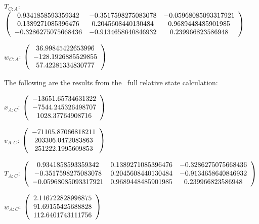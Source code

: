 \begin{description}
$T_{C:A}$: $\left( \begin{array} {ccc}
 0.9341858593359342 &   -0.3517598275083078 &  -0.05968085093317921 \\
  0.1389271085396476 &    0.2045608440130484 &    0.9689448485901985 \\
  -0.3286275075668436 &   -0.9134658640846932 &     0.239966823586948 \\
\end{array} \right)\\ \\$

$w_{C:A}$:  $\left( \begin{array} {ccc} 36.99845422653996 \\    -128.1926885529855 \\     57.42281334830777
\end{array} \right)\\ \\$

The following are the results from the \ full relative state calculation:

$x_{A:C}$: $\left( \begin{array} {ccc} -13651.65734631322 \\    -7544.245326498707 \\      1028.37764908716
\end{array} \right)\\ \\$

$v_{A:C}$:  $\left( \begin{array} {ccc}  -71105.87066818211 \\     203306.0472083863 \\     251222.1995609853
\end{array} \right)\\ \\$

$T_{A:C}$: $\left( \begin{array} {ccc}
0.9341858593359342 &    0.1389271085396476 &   -0.3286275075668436 \\
 -0.3517598275083078 &    0.2045608440130484 &   -0.9134658640846932 \\
 -0.05968085093317921 &    0.9689448485901985 &     0.239966823586948 \\
\end{array} \right)\\ \\$

$w_{A:C}$:  $\left( \begin{array} {ccc}
2.116722828998875 \\     91.69155425688828 \\     112.6401743111756
\end{array} \right)\\ \\$


\end{description}
